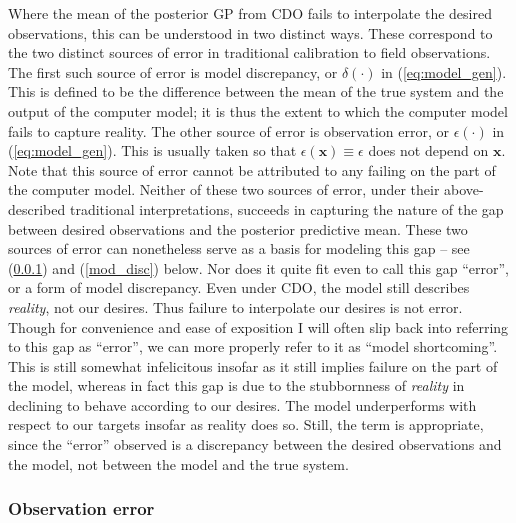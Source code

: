 \documentclass{article}
\begin{document}
Where the mean of the posterior GP from CDO fails to interpolate the desired observations, this can be understood in two distinct ways. These correspond to the two distinct sources of error in traditional calibration to field observations. The first such source of error is model discrepancy, or $\delta(\cdot)$ in (\ref{eq:model_gen}). This is defined to be the difference between the mean of the true system and the output of the computer model; it is thus the extent to which the computer model fails to capture reality. The other source of error is observation error, or $\epsilon(\cdot)$ in (\ref{eq:model_gen}). This is usually taken so that $\epsilon(\mathbf x) \equiv \epsilon$ does not depend on $\mathbf x$. Note that this source of error cannot be attributed to any failing on the part of the computer model. Neither of these two sources of error, under their above-described traditional interpretations, succeeds in capturing the nature of the gap between desired observations and the posterior predictive mean. These two sources of error can nonetheless serve as a basis for modeling this gap -- see (\ref{obs_error}) and (\ref{mod_disc}) below.
Nor does it quite fit even to call this gap ``error'', or a form of model discrepancy. Even under CDO, the model still describes \emph{reality}, not our desires. Thus failure to interpolate our desires is not error. Though for convenience and ease of exposition I will often slip back into referring to this gap as ``error'', we can more properly refer to it as ``model shortcoming''. This is still somewhat infelicitous insofar as it still implies failure on the part of the model, whereas in fact this gap is due to the stubbornness of \emph{reality} in declining to behave according to our desires. %
The model underperforms with respect to our targets insofar as reality does so. Still, the term is appropriate, since the ``error'' observed is a discrepancy between the desired observations and the model, not between the model and the true system.

\subsubsection{Observation error}\label{obs_error}


\end{document}
